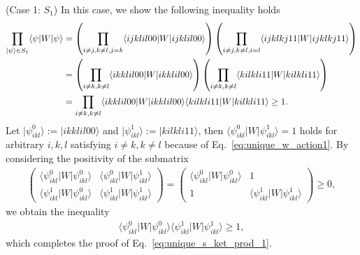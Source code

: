 \documentclass[a4paper,twocolumn,accepted=2022-10-23]{quantumarticle}
\newcommand{\bra}[1]{\langle {#1} \vert}
\newcommand{\ket}[1]{\vert {#1} \rangle}
\theoremstyle{definition}
\begin{document}
(Case 1: $S_1$) \quad
In this case, we show the following inequality holds
\begin{align}
\prod_{\ket{\psi} \in S_1} \bra{\psi} W \ket{\psi}
&= \left( \prod_{ i \neq j, k \neq l, j = k} \bra{ijklil00} W \ket{ijklil00} \right) \left( \prod_{ i \neq j, k \neq l, i = l} \bra{ijklkj11} W \ket{ijklkj11} \right) \notag \\
&= \left( \prod_{ i \neq k, k \neq l} \bra{ikklil00} W \ket{ikklil00} \right) \left( \prod_{ i \neq k, k \neq l} \bra{kilkli11} W \ket{kilkli11} \right) \notag  \\
&= \prod_{ i \neq k, k \neq l} \bra{ikklil00} W \ket{ikklil00} \bra{kilkli11} W \ket{kilkli11}
\geq 1 . \label{eq:unique_s_ket_prod_1}
\end{align}
Let $\ket{\psi_{ikl}^{0}} := \ket{ikklil00} $ and $\ket{\psi_{ikl}^1} := \ket{kilkli11}$,
then $\bra{\psi_{ikl}^{0}} W \ket{\psi_{ikl}^1} = 1$ holds for arbitrary $i,k,l$ satisfying $i\neq k, k \neq l$ because of Eq.~\eqref{eq:unique_w_action1}.
By considering the positivity of the submatrix
\begin{align}
\begin{pmatrix}
\bra{\psi_{ikl}^{0}} W \ket{\psi_{ikl}^{0}} & \bra{\psi_{ikl}^{0}} W \ket{\psi_{ikl}^1} \\
\bra{\psi_{ikl}^1} W \ket{\psi_{ikl}^{0}} & \bra{\psi_{ikl}^1} W \ket{\psi_{ikl}^1}
\end{pmatrix}
=
\begin{pmatrix}
\bra{\psi_{ikl}^{0}} W \ket{\psi_{ikl}^{0}} & 1 \\
1 & \bra{\psi_{ikl}^1} W \ket{\psi_{ikl}^1}
\end{pmatrix}
\geq 0,
\end{align}
we obtain the inequality
\begin{align}
\bra{\psi_{ikl}^{0}} W \ket{\psi_{ikl}^{0}} \bra{\psi_{ikl}^1} W \ket{\psi_{ikl}^1} \geq 1,
\end{align}
which completes the proof of Eq.~\eqref{eq:unique_s_ket_prod_1}.
\end{document}
